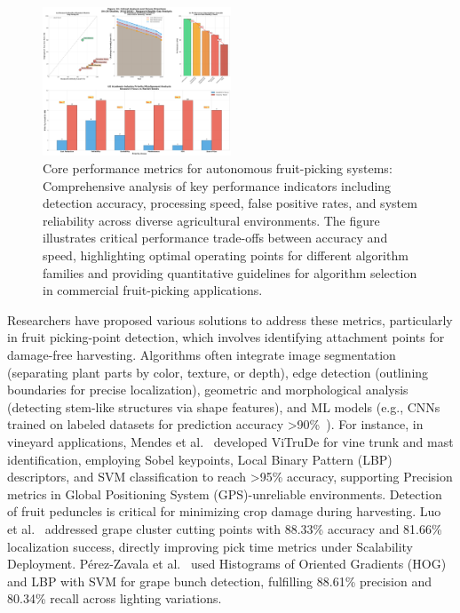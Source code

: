 \documentclass{ieeeaccess}
\begin{document}
\begin{figure}[hbtp]
\centering
\includegraphics[width=0.5\textwidth]{figure10_high_order_critical.png}
\caption{Core performance metrics for autonomous fruit-picking systems: Comprehensive analysis of key performance indicators including detection accuracy, processing speed, false positive rates, and system reliability across diverse agricultural environments. The figure illustrates critical performance trade-offs between accuracy and speed, highlighting optimal operating points for different algorithm families and providing quantitative guidelines for algorithm selection in commercial fruit-picking applications.}
\label{fig:performance}
\end{figure}

Researchers have proposed various solutions to address these metrics, particularly in fruit picking-point detection, which involves identifying attachment points for damage-free harvesting. Algorithms often integrate image segmentation (separating plant parts by color, texture, or depth), edge detection (outlining boundaries for precise localization), geometric and morphological analysis (detecting stem-like structures via shape features), and ML models (e.g., CNNs trained on labeled datasets for prediction accuracy >90\%~\cite{mendes2016vine}).
For instance, in vineyard applications, Mendes et al.~\cite{mendes2016vine} developed ViTruDe for vine trunk and mast identification, employing Sobel keypoints, Local Binary Pattern (LBP) descriptors, and SVM classification to reach >95\% accuracy, supporting Precision metrics in  Global Positioning System (GPS)-unreliable environments.
Detection of fruit peduncles is critical for minimizing crop damage during harvesting. 
Luo et al.~\cite{luo2018vision} addressed grape cluster cutting points with 88.33\% accuracy and 81.66\% localization success, directly improving pick time metrics under Scalability Deployment.
Pérez-Zavala et al.~\cite{perez2018pattern} used Histograms of Oriented Gradients (HOG) and LBP with SVM for grape bunch detection, fulfilling 88.61\% precision and 80.34\% recall across lighting variations.
\end{document}

